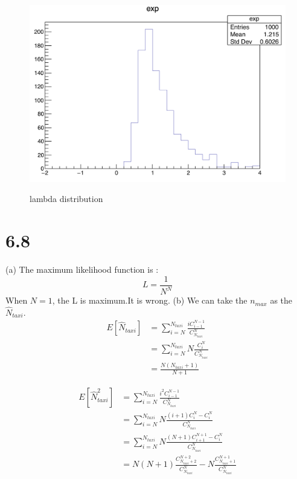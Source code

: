 \documentclass{article}
\begin{document}
\begin{CJK*}{GBK}{song}
\begin{figure}[htb]
{\includegraphics[width=.24\textwidth]{n=5}}\hfill
{}\hfill
{}\hfill
\caption{lambda distribution}
\label{fig:1}
\end{figure}


 
 \section{6.8}
 (a)
 The maximum likelihood function is : 
 \begin{equation}
 L=\frac{1}{N^N}
 \end{equation}
 When $N=1$, the L is maximum.It is wrong.
 (b)
 We can take the $n_{max}$ as the $\hat{N}_{taxi}$.
 \begin{equation}
 \begin{aligned}
 E[\hat{N}_{taxi}]&=\sum_{i=N}^{N_{taxi}}\frac{iC_{i-1}^{N-1}}{C_{N_{taxi}}^N}\\
 &=\sum_{i=N}^{N_{taxi}}N\frac{C_{i}^{N}}{C_{N_{taxi}}^N}\\
 &=\frac{N(N_{taxi}+1)}{N+1}
 \end{aligned}
 \end{equation}
 
 \begin{equation}
 \begin{aligned}
E[\hat{N}_{taxi}^2]&=\sum_{i=N}^{N_{taxi}}\frac{i^2C_{i-1}^{N-1}}{C_{N_{taxi}}^N}\\
&=\sum_{i=N}^{N_{taxi}}N\frac{(i+1)C_{i}^{N}-C_{i}^{N}}{C_{N_{taxi}}^N}\\
&=\sum_{i=N}^{N_{taxi}}N\frac{(N+1)C_{i+1}^{N+1}-C_{i}^{N}}{C_{N_{taxi}}^N}\\
&=N(N+1)\frac{C^{N+2}_{N_{taxi}+2}}{C_{N_{taxi}}^N}-N\frac{C^{N+1}_{N_{taxi}+1}}{C_{N_{taxi}}^N}
 \end{aligned}
 \end{equation}
 

\end{CJK*}
\end{document}
